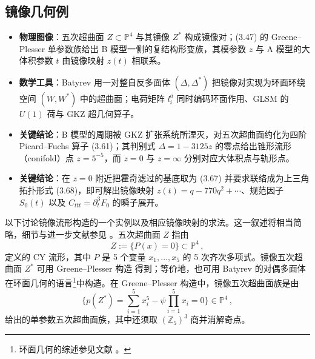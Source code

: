 

\subsection{镜像几何例}
\label{sec:3.6}

\begin{keytakeaways}
  \begin{itemize}[leftmargin=1.4em,itemsep=2pt,topsep=2pt]
    \item \textbf{物理图像}：五次超曲面 $Z\subset\mathbb{P}^4$ 与其镜像 $Z^*$ 构成镜像对；(3.47) 的 Greene--Plesser 单参数族给出 B 模型一侧的复结构形变族，其模参数 $z$ 与 A 模型的大体积参数 $t$ 由镜像映射 $z(t)$ 相联系。
    \item \textbf{数学工具}：Batyrev 用一对整自反多面体 $(\Delta,\Delta^*)$ 把镜像对实现为环面环绕空间 $(W,W^*)$ 中的超曲面；电荷矩阵 $l_i^a$ 同时编码环面作用、GLSM 的 $U(1)$ 荷与 GKZ 超几何算子。
    \item \textbf{关键结论}：B 模型的周期被 GKZ 扩张系统所湮灭，对五次超曲面约化为四阶 Picard--Fuchs 算子 (3.61)；其判别式 $\Delta=1-3125z$ 的零点给出锥形流形（conifold）点 $z=5^{-5}$，而 $z=0$ 与 $z=\infty$ 分别对应大体积点与轨形点。
    \item \textbf{关键结论}：在 $z=0$ 附近把霍奇滤过的基底取为 (3.67) 并要求联络成为上三角拓扑形式 (3.68)，即可解出镜像映射 $z(t)=q-770q^{2}+\cdots$、规范因子 $S_0(t)$ 以及 $C_{ttt}=\partial_t^3F_0$ 的瞬子展开。
  \end{itemize}
\end{keytakeaways}

以下讨论镜像流形构造的一个实例以及相应镜像映射的求法。这一叙述将相当简略，细节与进一步文献参见 \cite{ref12,ref8,ref48,ref9,ref64}。五次超曲面 $Z$ 指由
\begin{equation}\tag{3.46}
Z:=\{P(x)=0\}\subset\mathbb{P}^4\,,
\end{equation}
定义的 CY 流形，其中 $P$ 是 5 个变量 $x_1,\dots,x_5$ 的 5 次齐次多项式。镜像五次超曲面 $Z^*$ 可用 Greene--Plesser 构造 \cite{ref11} 得到；等价地，也可用 Batyrev 的对偶多面体 \cite{ref65} 在环面几何的语言\footnote{环面几何的综述参见文献 \cite{ref29,ref9}。}中构造。在 Greene--Plesser 构造中，镜像五次超曲面族是由
\begin{equation}\tag{3.47}
\{p(Z^*)=\sum_{i=1}^{5}x_i^5-\psi\prod_{i=1}^{5}x_i=0\}\in\mathbb{P}^4\,,
\end{equation}
给出的单参数五次超曲面族，其中还须取 $(\mathbb{Z}_5)^3$ 商并消解奇点。

